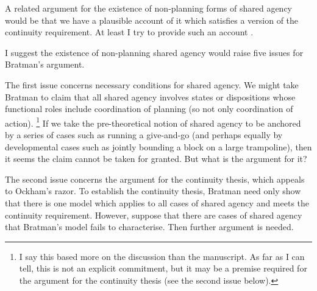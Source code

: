 \documentclass[12pt,letterpaper]{extarticle}
\begin{document}
A related argument for the existence of non-planning forms of shared agency would be that we have a plausible account of it which satisfies a version of the continuity requirement.
At least I try to provide such an account \citep{Butterfill:2011fk,Butterfill:2011_wija}.

I suggest the existence of non-planning shared agency would raise five issues for Bratman's argument.

The first issue concerns necessary conditions for shared agency. 
We might take Bratman to claim that all shared agency involves states or dispositions whose functional roles include coordination of planning (so not only coordination of action).%
\footnote{
I say this based more on the discussion than the manuscript.
As far as I can tell, this is not an explicit commitment, but it may be a premise required for the argument for the continuity thesis (see the second issue below).
}
If we take the pre-theoretical notion of shared agency to be anchored by a series of cases such as running a give-and-go (and perhaps equally by developmental cases such as jointly bounding a block on a large trampoline), then it seems the claim cannot be taken for granted.
But what is the argument for it?

The second issue concerns the argument for the continuity thesis, which appeals to Ockham's razor.
To establish the continuity thesis, Bratman need only show that there is one model which applies to all cases of shared agency and meets the continuity requirement.
However, suppose that there are cases of shared agency that Bratman's model fails to characterise.
Then further argument is needed. 
\end{document}
